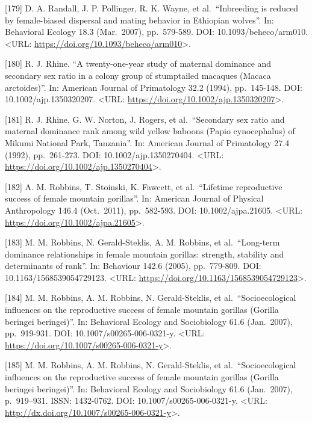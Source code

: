 \documentclass[
]{article}
\begin{document}
{[}179{]} D. A. Randall, J. P. Pollinger, R. K. Wayne, et
al.~``Inbreeding is reduced by female-biased dispersal and mating
behavior in Ethiopian wolves''. In: Behavioral Ecology 18.3 (Mar.~2007),
pp.~579-589. DOI: 10.1093/beheco/arm010. \textless URL:
\url{https://doi.org/10.1093/beheco/arm010}\textgreater.

{[}180{]} R. J. Rhine. ``A twenty-one-year study of maternal dominance
and secondary sex ratio in a colony group of stumptailed macaques
(Macaca arctoides)''. In: American Journal of Primatology 32.2 (1994),
pp.~145-148. DOI: 10.1002/ajp.1350320207. \textless URL:
\url{https://doi.org/10.1002/ajp.1350320207}\textgreater.

{[}181{]} R. J. Rhine, G. W. Norton, J. Rogers, et al.~``Secondary sex
ratio and maternal dominance rank among wild yellow baboons (Papio
cynocephalus) of Mikumi National Park, Tanzania''. In: American Journal
of Primatology 27.4 (1992), pp.~261-273. DOI: 10.1002/ajp.1350270404.
\textless URL: \url{https://doi.org/10.1002/ajp.1350270404}\textgreater.

{[}182{]} A. M. Robbins, T. Stoinski, K. Fawcett, et al.~``Lifetime
reproductive success of female mountain gorillas''. In: American Journal
of Physical Anthropology 146.4 (Oct.~2011), pp.~582-593. DOI:
10.1002/ajpa.21605. \textless URL:
\url{https://doi.org/10.1002/ajpa.21605}\textgreater.

{[}183{]} M. M. Robbins, N. Gerald-Steklis, A. M. Robbins, et
al.~``Long-term dominance relationships in female mountain gorillas:
strength, stability and determinants of rank''. In: Behaviour 142.6
(2005), pp.~779-809. DOI: 10.1163/1568539054729123. \textless URL:
\url{https://doi.org/10.1163/1568539054729123}\textgreater.

{[}184{]} M. M. Robbins, A. M. Robbins, N. Gerald-Steklis, et
al.~``Socioecological influences on the reproductive success of female
mountain gorillas (Gorilla beringei beringei)''. In: Behavioral Ecology
and Sociobiology 61.6 (Jan.~2007), pp.~919-931. DOI:
10.1007/s00265-006-0321-y. \textless URL:
\url{https://doi.org/10.1007/s00265-006-0321-y}\textgreater.

{[}185{]} M. M. Robbins, A. M. Robbins, N. Gerald-Steklis, et
al.~``Socioecological influences on the reproductive success of female
mountain gorillas (Gorilla beringei beringei)''. In: Behavioral Ecology
and Sociobiology 61.6 (Jan.~2007), p.~919--931. ISSN: 1432-0762. DOI:
10.1007/s00265-006-0321-y. \textless URL:
\url{http://dx.doi.org/10.1007/s00265-006-0321-y}\textgreater.
\end{document}

